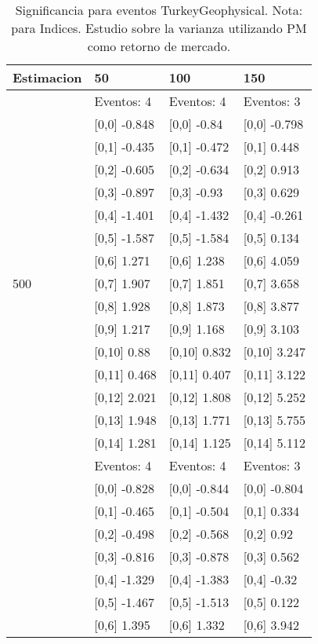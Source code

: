 \begin{table}

\caption{Significancia para eventos TurkeyGeophysical. Nota: para Indices. Estudio sobre la varianza utilizando PM como retorno de mercado.}
\centering
\begin{tabular}[t]{llll}
\toprule
Estimacion & 50 & 100 & 150\\
\midrule
 & Eventos:  4 & Eventos:  4 & Eventos:  3\\
 & {}[0,0] -0.848 & {}[0,0] -0.84 & {}[0,0] -0.798\\
 & {}[0,1] -0.435 & {}[0,1] -0.472 & {}[0,1] 0.448\\
 & {}[0,2] -0.605 & {}[0,2] -0.634 & {}[0,2] 0.913\\
 & {}[0,3] -0.897 & {}[0,3] -0.93 & {}[0,3] 0.629\\
\addlinespace
 & {}[0,4] -1.401 & {}[0,4] -1.432 & {}[0,4] -0.261\\
 & {}[0,5] -1.587 & {}[0,5] -1.584 & {}[0,5] 0.134\\
 & {}[0,6] 1.271 & {}[0,6] 1.238 & {}[0,6] 4.059\\
500 & {}[0,7] 1.907 & {}[0,7] 1.851 & {}[0,7] 3.658\\
 & {}[0,8] 1.928 & {}[0,8] 1.873 & {}[0,8] 3.877\\
\addlinespace
 & {}[0,9] 1.217 & {}[0,9] 1.168 & {}[0,9] 3.103\\
 & {}[0,10] 0.88 & {}[0,10] 0.832 & {}[0,10] 3.247\\
 & {}[0,11] 0.468 & {}[0,11] 0.407 & {}[0,11] 3.122\\
 & {}[0,12] 2.021 & {}[0,12] 1.808 & {}[0,12] 5.252\\
 & {}[0,13] 1.948 & {}[0,13] 1.771 & {}[0,13] 5.755\\
\addlinespace
 & {}[0,14] 1.281 & {}[0,14] 1.125 & {}[0,14] 5.112\\
 & Eventos:  4 & Eventos:  4 & Eventos:  3\\
 & {}[0,0] -0.828 & {}[0,0] -0.844 & {}[0,0] -0.804\\
 & {}[0,1] -0.465 & {}[0,1] -0.504 & {}[0,1] 0.334\\
 & {}[0,2] -0.498 & {}[0,2] -0.568 & {}[0,2] 0.92\\
\addlinespace
 & {}[0,3] -0.816 & {}[0,3] -0.878 & {}[0,3] 0.562\\
 & {}[0,4] -1.329 & {}[0,4] -1.383 & {}[0,4] -0.32\\
 & {}[0,5] -1.467 & {}[0,5] -1.513 & {}[0,5] 0.122\\
 & {}[0,6] 1.395 & {}[0,6] 1.332 & {}[0,6] 3.942\\

\end{tabular}
\end{table}

